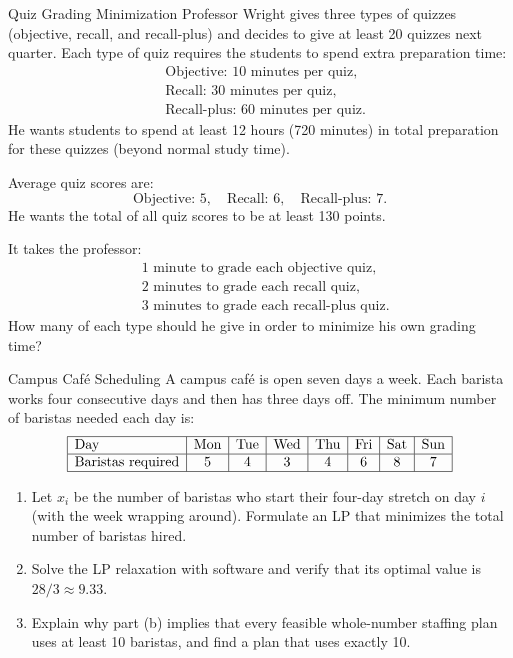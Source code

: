 \begin{ex}{Quiz Grading Minimization}{}
 Professor Wright gives three types of quizzes (objective, recall, and recall-plus) and decides to give at least 20 quizzes next quarter. Each type of quiz requires the students to spend extra preparation time:
\[
\begin{aligned}
&\text{Objective: } 10 \text{ minutes per quiz},\\
&\text{Recall: } 30 \text{ minutes per quiz},\\
&\text{Recall-plus: } 60 \text{ minutes per quiz}.
\end{aligned}
\]
He wants students to spend at least 12 hours (720 minutes) in total preparation for these quizzes (beyond normal study time).

Average quiz scores are:
\[
\text{Objective: } 5,\quad
\text{Recall: } 6,\quad
\text{Recall-plus: } 7.
\]
He wants the total of all quiz scores to be at least 130 points.

It takes the professor:
\[
\begin{aligned}
& 1 \text{ minute to grade each objective quiz},\\
& 2 \text{ minutes to grade each recall quiz},\\
& 3 \text{ minutes to grade each recall-plus quiz}.
\end{aligned}
\]
How many of each type should he give in order to minimize his own grading time?
\end{ex}

\begin{ex}{Campus Caf\'e Scheduling}{}
\label{ex:cafe-scheduling}
 A campus caf\'e is open seven days a week. Each barista works four consecutive days and then has three days off. The minimum number of baristas needed each day is:
\[
\begin{array}{|l|c|c|c|c|c|c|c|}
\hline
\text{Day} & \text{Mon} & \text{Tue} & \text{Wed} & \text{Thu} & \text{Fri} & \text{Sat} & \text{Sun} \\
\hline
\text{Baristas required} & 5 & 4 & 3 & 4 & 6 & 8 & 7 \\
\hline
\end{array}
\]
\par{}\label{tab:modeling-linear-programming-tab09}%

\begin{enumerate}
\item Let $x_i$ be the number of baristas who start their four-day stretch on day $i$ (with the week wrapping around). Formulate an LP that minimizes the total number of baristas hired.
\item Solve the LP relaxation with software and verify that its optimal value is $28/3 \approx 9.33$.
\item Explain why part (b) implies that every feasible whole-number staffing plan uses at least 10 baristas, and find a plan that uses exactly 10.
\end{enumerate}
\end{ex}

